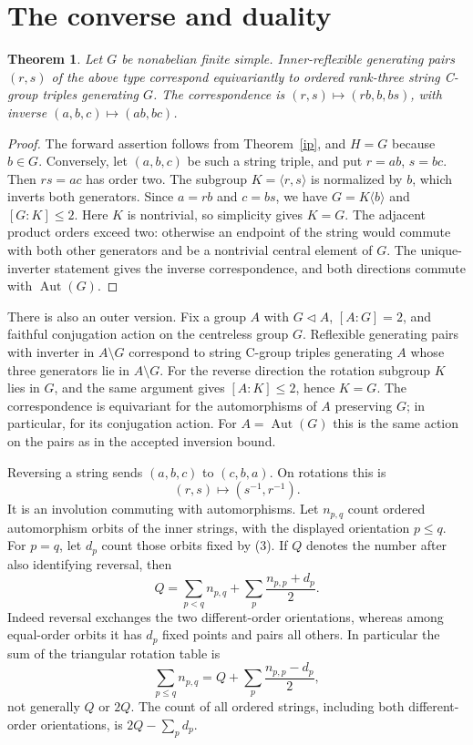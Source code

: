 \documentclass[11pt,a4paper]{article}
\newtheorem{theorem}{Theorem}\newtheorem{lemma}[theorem]{Lemma}
\newcommand{\Aut}{\operatorname{Aut}}
\begin{document}
\section{The converse and duality}
\begin{theorem}\label{simple}
Let $G$ be nonabelian finite simple. Inner-reflexible generating pairs
$(r,s)$ of the above type correspond equivariantly to ordered rank-three
string C-group triples generating $G$. The correspondence is
$(r,s)\mapsto(rb,b,bs)$, with inverse $(a,b,c)\mapsto(ab,bc)$.
\end{theorem}
\begin{proof}
The forward assertion follows from Theorem~\ref{ip}, and
$H=G$ because $b\in G$. Conversely, let $(a,b,c)$ be such a
string triple, and put $r=ab$, $s=bc$. Then $rs=ac$ has order two.
The subgroup $K=\langle r,s\rangle$ is normalized by $b$, which
inverts both generators. Since $a=rb$ and $c=bs$, we have
$G=K\langle b\rangle$ and $[G:K]\leq2$. Here $K$ is nontrivial,
so simplicity gives $K=G$. The adjacent product orders exceed two:
otherwise an endpoint of the string would commute with both other
generators and be a nontrivial central element of $G$.
The unique-inverter statement gives the inverse correspondence,
and both directions commute with $\Aut(G)$.
\end{proof}
There is also an outer version. Fix a group $A$ with $G\lhd A$,
$[A:G]=2$, and faithful conjugation action on the centreless group
$G$. Reflexible generating pairs with inverter in $A\setminus G$
correspond to string C-group triples generating $A$ whose three
generators lie in $A\setminus G$. For the reverse direction the
rotation subgroup $K$ lies in $G$, and the same argument gives
$[A:K]\leq2$, hence $K=G$. The correspondence is equivariant for
the automorphisms of $A$ preserving $G$; in particular, for its
conjugation action. For $A=\Aut(G)$ this is the same action on
the pairs as in the accepted inversion bound.

Reversing a string sends $(a,b,c)$ to $(c,b,a)$. On rotations this is
\[
                   (r,s)\longmapsto(s^{-1},r^{-1}).       \tag{3}
\]
It is an involution commuting with automorphisms. Let $n_{p,q}$
count ordered automorphism orbits of the inner strings, with the
displayed orientation $p\leq q$. For $p=q$, let $d_p$ count those
orbits fixed by (3). If $Q$ denotes the number after also identifying
reversal, then
\[
 Q=\sum_{p<q}n_{p,q}+\sum_p\frac{n_{p,p}+d_p}{2}.        \tag{4}
\]
Indeed reversal exchanges the two different-order orientations,
whereas among equal-order orbits it has $d_p$ fixed points and
pairs all others. In particular the sum of the triangular rotation
table is
\[
 \sum_{p\leq q}n_{p,q}=Q+\sum_p\frac{n_{p,p}-d_p}{2},    \tag{5}
\]
not generally $Q$ or $2Q$. The count of all ordered strings, including
both different-order orientations, is $2Q-\sum_p d_p$.
\end{document}
